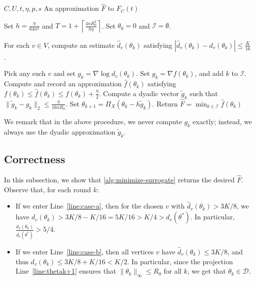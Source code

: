 \documentclass[11pt,reqno,letterpaper]{amsart}
\numberwithin{equation}{section}
\theoremstyle{definition}
\theoremstyle{remark}
\begin{document}
\begin{algorithm}[htbp]
\caption{\textsc{MinimizeSurrogate}}
\label{alg:minimize-surrogate}
\begin{algorithmic}[1]
\Require $C,U,t,\eta,p,s$
\Ensure An approximation $\widehat F$ to $F_C(t)$

\State Set $h=\frac{\eta}{64n^2}$ and  $T=1+\left\lceil\frac{4nR_0^2}{h\eta}\right\rceil$.
\State Set $\theta_0=0$ and $\mathcal I=\emptyset$.

    \State For each $v\in V$, compute an estimate
    $\widehat d_v(\theta_k)$ satisfying
    $|\widehat d_v(\theta_k)-d_v(\theta_k)|\le \frac K{16}$. \label{line:dv}

     \label{line:case-a}
        \State Pick any such $v$ and set
        $g_k=\nabla\log d_v(\theta_k)$.
    \Else \label{line:case-b}
        \State Set
        $g_k=\nabla f(\theta_k)$,
        and add $k$ to $\mathcal I$. 
        \State Compute and record an  approximation
        $\widehat f(\theta_k)$ satisfying
        $f(\theta_k)
        \le \widehat f(\theta_k)
        \le f(\theta_k)+\frac{\eta}{2}$. \label{line:tildef}
    \EndIf
    \State Compute a dyadic vector $\widetilde g_k$ such that $\|\widetilde g_k-g_k\|_2\leq\frac{\eta}{16nR_0}$. \label{line:gk}
    \State Set $\theta_{k+1}=\Pi_X(\theta_k-h\widetilde g_k)$. \label{line:thetak+1}
\EndFor
\State Return  $\widehat F=\min_{k\in\mathcal I}\widehat f(\theta_k)$\label{line:final}
\end{algorithmic}
\end{algorithm}


\medskip


We remark that in the above procedure, we never compute $g_k$ exactly; instead, we always use the dyadic approximation $\widetilde g_k$.



\newcommand{\lineref}[1]{Line~\ref{#1}}


\subsection{Correctness} In this subsection, we show that \cref{alg:minimize-surrogate} returns the desired $\widehat F$. Observe that, for each round $k$:

\begin{itemize}
    \item If we enter \lineref{line:case-a}, then for the chosen $v$ with $\widehat d_v(\theta_k)>3K/8$, we have
    $d_v(\theta_k)>3K/8-K/16=5K/16>K/4>d_v(\theta^*)$.
    In particular, $\frac{d_v(\theta_k)}{d_v(\theta^*)}>5/4$.
    \item If we enter \lineref{line:case-b}, then
all vertices $v$ have $\widehat d_v(\theta_k)\leq 3K/8$, and thus $ d_v(\theta_k)\leq 3K/8+K/16<K/2$.
    In particular, since the projection \lineref{line:thetak+1} ensures that $\|\theta_k\|_\infty\leq R_0$ for all $k$, we get that $\theta_k\in \mathcal D$.
\end{itemize}
\end{document}
